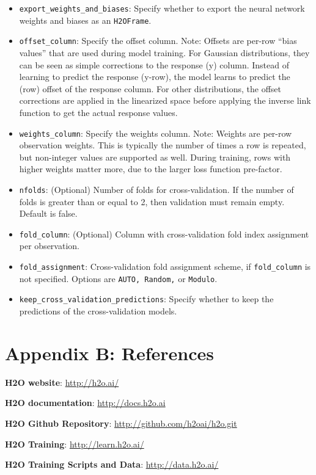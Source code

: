 \documentclass{article}[11pt]
\begin{document}
\begin{itemize}
\item \texttt{export\_weights\_and\_biases}: Specify whether to export the neural network weights and biases as an \texttt{H2OFrame}. 
\item \texttt{offset\_column}: Specify the offset column. Note: Offsets are per-row “bias values” that are used during model training. For Gaussian distributions, they can be seen as simple corrections to the response (y) column. Instead of learning to predict the response (y-row), the model learns to predict the (row) offset of the response column. For other distributions, the offset corrections are applied in the linearized space before applying the inverse link function to get the actual response values. 
\item \texttt{weights\_column}: Specify the weights column. Note: Weights are per-row observation weights. This is typically the number of times a row is repeated, but non-integer values are supported as well. During training, rows with higher weights matter more, due to the larger loss function pre-factor.
\item \texttt{nfolds}: (Optional) Number of folds for cross-validation. If the number of folds is greater than or equal to 2, then validation must remain empty. Default is false.
\item \texttt{fold\_column}: (Optional) Column with cross-validation fold index assignment per observation. 
\item \texttt{fold\_assignment}: Cross-validation fold assignment scheme, if \texttt{fold\_column} is not specified. Options are \texttt{AUTO, Random,} or \texttt{Modulo}. 
\item \texttt{keep\_cross\_validation\_predictions}: Specify whether to keep the predictions of the cross-validation models. 

\end{itemize}

\newpage
\section{Appendix B: References}

\textbf{H2O website}:  {\url{http://h2o.ai/}}

\textbf{H2O documentation}:  {\url{http://docs.h2o.ai}}

\textbf{H2O Github Repository}:  {\url{http://github.com/h2oai/h2o.git}}

\textbf{H2O Training}:    {\url{http://learn.h2o.ai/}}

\textbf{H2O Training Scripts and Data}: {\url{http://data.h2o.ai/}} 
\end{document}
